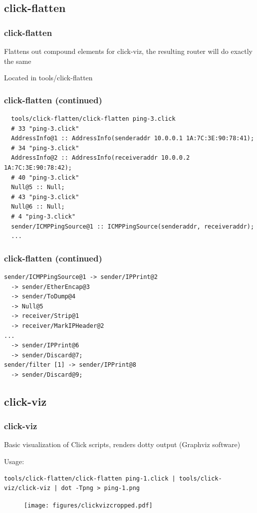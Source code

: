 \documentclass{beamer}
\begin{document}
\subsection{click-flatten} %
\label{sub:click_flatten}

\begin{frame}[fragile]
\frametitle{click-flatten}
Flattens out compound elements for click-viz, the resulting router will do exactly the same

Located in tools/click-flatten
\end{frame}

\begin{frame}[fragile]
\frametitle{click-flatten (continued)}
\begin{lstlisting}
  tools/click-flatten/click-flatten ping-3.click
  # 33 "ping-3.click"
  AddressInfo@1 :: AddressInfo(senderaddr 10.0.0.1 1A:7C:3E:90:78:41);
  # 34 "ping-3.click"
  AddressInfo@2 :: AddressInfo(receiveraddr 10.0.0.2 1A:7C:3E:90:78:42);
  # 40 "ping-3.click"
  Null@5 :: Null;
  # 43 "ping-3.click"
  Null@6 :: Null;
  # 4 "ping-3.click"
  sender/ICMPPingSource@1 :: ICMPPingSource(senderaddr, receiveraddr);
  ...
\end{lstlisting}
\end{frame}

\begin{frame}[fragile]
\frametitle{click-flatten (continued)}
\begin{lstlisting}
sender/ICMPPingSource@1 -> sender/IPPrint@2
  -> sender/EtherEncap@3
  -> sender/ToDump@4
  -> Null@5
  -> receiver/Strip@1
  -> receiver/MarkIPHeader@2
...
  -> sender/IPPrint@6
  -> sender/Discard@7;
sender/filter [1] -> sender/IPPrint@8
  -> sender/Discard@9;
\end{lstlisting}
\end{frame}
\subsection{click-viz} %
\label{sub:click_viz}

\begin{frame}[fragile]
\frametitle{click-viz}
\begin{minipage}[t]{0.7\linewidth}

Basic visualization of Click scripts, renders dotty output (Graphviz software)

Usage:
\begin{lstlisting}
tools/click-flatten/click-flatten ping-1.click | tools/click-viz/click-viz | dot -Tpng > ping-1.png
\end{lstlisting}

\end{minipage}
\begin{minipage}[t]{0.15\linewidth}
\begin{figure}[t]
	\centering
	\texttt{[image: figures/clickvizcropped.pdf]}
\end{figure}
\end{minipage}

\end{frame}
\end{document}
